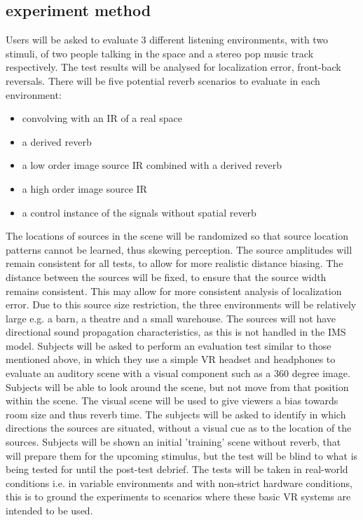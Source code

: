 \documentclass[paper=a4, fontsize=10pt, font=arial]{scrartcl} %
\numberwithin{equation}{section} %
\numberwithin{figure}{section} %
\numberwithin{table}{section} %
\begin{document}
\subsection{experiment method}
Users will be asked to evaluate 3 different listening environments, with two stimuli, of two people talking in the space and a stereo pop music track respectively. The test results will be analysed for localization error, front-back reversals. There will be five potential reverb scenarios to evaluate in each environment: 
\begin{itemize}
\item convolving with an IR of a real space
\item a derived reverb
\item a low order image source IR combined with a derived reverb
\item a high order image source IR
\item a control instance of the signals without spatial reverb
\end{itemize}
The locations of sources in the scene will be randomized so that source location patterns cannot be learned, thus skewing perception. The source amplitudes will remain consistent for all tests, to allow for more realistic distance biasing. The distance between the sources will be fixed, to ensure that the source width remains consistent. This may allow for more consistent analysis of localization error. Due to this source size restriction, the three environments will be relatively large e.g. a barn, a theatre and a small warehouse. The sources will not have directional sound propagation characteristics, as this is not handled in the IMS model.
Subjects will be asked to perform an evaluation test similar to those mentioned above, in which they use a simple VR headset and headphones to evaluate an auditory scene with a visual component such as a 360 degree image. Subjects will be able to look around the scene, but not move from that position within the scene. The visual scene will be used to give viewers a bias towards room size and thus reverb time. The subjects will be asked to identify in which directions the sources are situated, without a visual cue as to the location of the sources. 
Subjects will be shown an initial 'training' scene without reverb, that will prepare them for the upcoming stimulus, but the test will be blind to what is being tested for until the post-test debrief. The tests will be taken in real-world conditions i.e. in variable environments and with non-strict hardware conditions, this is to ground the experiments to scenarios where these basic VR systems are intended to be used.
\end{document}
